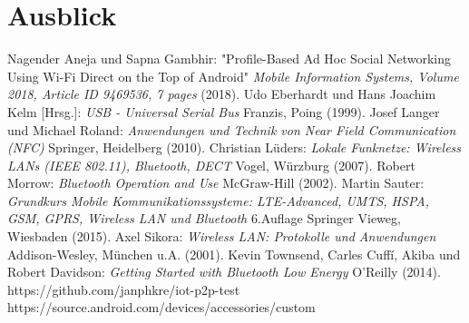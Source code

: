 \documentclass[12pt,a4paper]{article}
\begin{document}
\section{Ausblick}

    \begin{thebibliography}{10}
        Nagender Aneja und Sapna Gambhir: "Profile-Based Ad Hoc Social Networking Using Wi-Fi Direct on the Top of Android" {\it Mobile Information Systems, Volume 2018, Article ID 9469536, 7 pages} (2018).
         Udo Eberhardt und Hans Joachim Kelm [Hrsg.]: {\it USB - Universal Serial Bus} Franzis, Poing (1999).
        Josef Langer und Michael Roland: {\it Anwendungen und Technik von Near Field Communication (NFC)} Springer, Heidelberg (2010).
        Christian Lüders: {\it Lokale Funknetze: Wireless LANs (IEEE 802.11), Bluetooth, DECT} Vogel, Würzburg (2007).
        Robert Morrow: {\it Bluetooth Operation and Use} McGraw-Hill (2002).
        Martin Sauter: {\it Grundkurs Mobile Kommunikationssysteme: LTE-Advanced, UMTS, HSPA, GSM, GPRS, Wireless LAN und Bluetooth} 6.Auflage Springer Vieweg, Wiesbaden (2015).
        Axel Sikora: {\it Wireless LAN: Protokolle und Anwendungen} Addison-Wesley, München u.A. (2001).
		 Kevin Townsend, Carles Cuffí, Akiba und Robert Davidson: {\it Getting Started with Bluetooth Low Energy} O'Reilly (2014).
        https://github.com/janphkre/iot-p2p-test
        https://source.android.com/devices/accessories/custom
    \end{thebibliography}
\end{document}
